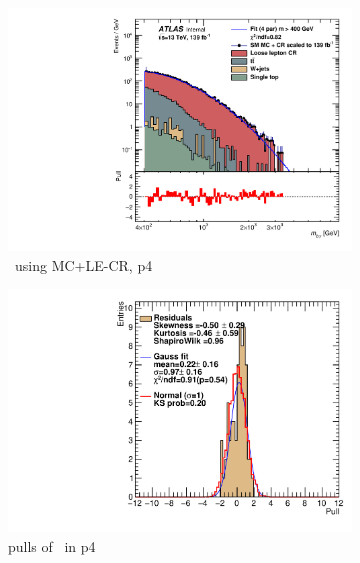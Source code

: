 \begin{figure}[H]
    \centering
    \begin{subfigure}[h]{0.38\linewidth}
    \includegraphics[scale=0.3]{figs/ch6/fit/variable_nosmooth/p4/10PB/output_SMMCplusCR_Mbg_p4.pdf}%
    \caption{\mbph \ using MC+LE-CR, p4}
    \end{subfigure}
    \hfill
    \begin{subfigure}[h]{0.4\linewidth}
    \includegraphics[scale=0.32]{figs/ch6/fit/variable_nosmooth/p4/10PB/pull_SMMCplusCR_Mbg_p4.pdf}%
    \caption{pulls of \mbph \ in p4}
    \end{subfigure}
    \hfill
    \begin{subfigure}[h]{0.38\linewidth}

\end{subfigure}
\end{figure}
